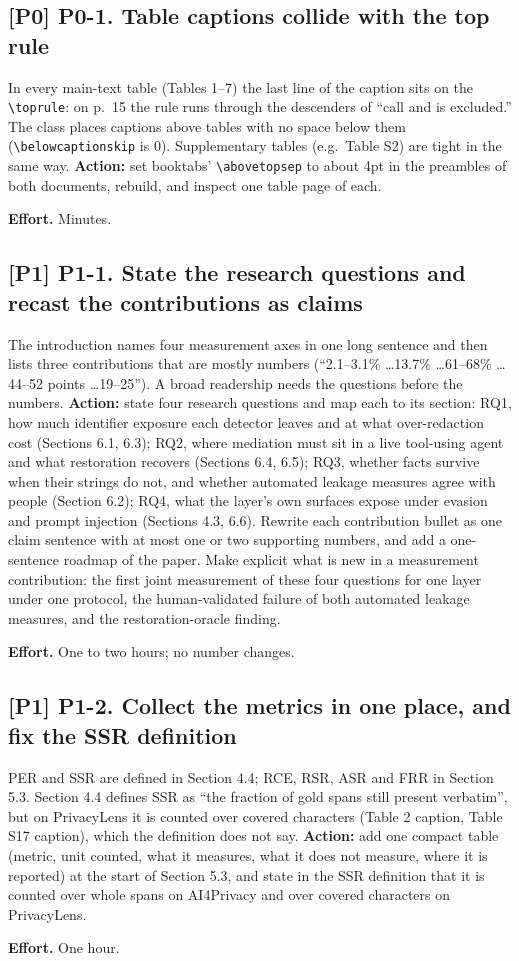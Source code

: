\documentclass[10pt]{article}
\newcommand{\pz}{\textbf{[P0]}}
\newcommand{\po}{\textbf{[P1]}}
\newcommand{\effort}[1]{\par\noindent\textbf{Effort.} #1}
\begin{document}
\subsection*{\pz{} P0-1. Table captions collide with the top rule}
In every main-text table (Tables 1--7) the last line of the caption sits on the \verb|\toprule|: on p.~15 the rule
runs through the descenders of ``call and is excluded.'' The class places captions above tables with no space below
them (\verb|\belowcaptionskip| is 0). Supplementary tables (e.g.\ Table S2) are tight in the same way.
\textbf{Action:} set booktabs' \verb|\abovetopsep| to about 4pt in the preambles of both documents, rebuild, and
inspect one table page of each.
\effort{Minutes.}

\subsection*{\po{} P1-1. State the research questions and recast the contributions as claims}
The introduction names four measurement axes in one long sentence and then lists three contributions that are
mostly numbers (``2.1--3.1\% \ldots 13.7\% \ldots 61--68\% \ldots 44--52 points \ldots 19--25''). A broad
readership needs the questions before the numbers.
\textbf{Action:} state four research questions and map each to its section: RQ1, how much identifier exposure each
detector leaves and at what over-redaction cost (Sections 6.1, 6.3); RQ2, where mediation must sit in a live
tool-using agent and what restoration recovers (Sections 6.4, 6.5); RQ3, whether facts survive when their strings do
not, and whether automated leakage measures agree with people (Section 6.2); RQ4, what the layer's own surfaces expose
under evasion and prompt injection (Sections 4.3, 6.6). Rewrite each contribution bullet as one claim sentence with at
most one or two supporting numbers, and add a one-sentence roadmap of the paper. Make explicit what is new in a
measurement contribution: the first joint measurement of these four questions for one layer under one protocol, the
human-validated failure of both automated leakage measures, and the restoration-oracle finding.
\effort{One to two hours; no number changes.}

\subsection*{\po{} P1-2. Collect the metrics in one place, and fix the SSR definition}
PER and SSR are defined in Section 4.4; RCE, RSR, ASR and FRR in Section 5.3. Section 4.4 defines SSR as ``the
fraction of gold spans still present verbatim'', but on PrivacyLens it is counted over covered characters (Table 2
caption, Table S17 caption), which the definition does not say.
\textbf{Action:} add one compact table (metric, unit counted, what it measures, what it does not measure, where it is
reported) at the start of Section 5.3, and state in the SSR definition that it is counted over whole spans on
AI4Privacy and over covered characters on PrivacyLens.
\effort{One hour.}
\end{document}
